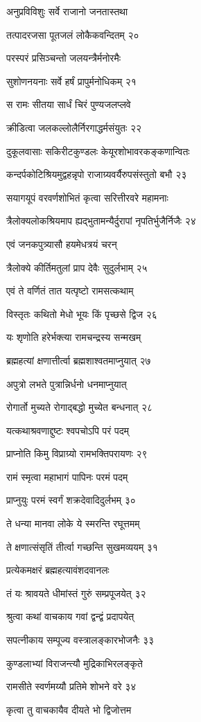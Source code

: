 अनुप्रविविशुः सर्वे राजानो जनतास्तथा

तत्पादरजसा पूतजलं लोकैकवन्दितम् २०

परस्परं प्रसिञ्चन्तो जलयन्त्रैर्मनोरमैः

सुशोणनयनाः सर्वे हर्षं प्रापुर्मनोधिकम् २१

स रामः सीतया सार्धं चिरं पुण्यजलप्लवे

क्रीडित्वा जलकल्लोलैर्निरगाद्धर्मसंयुतः २२

दुकूलवासाः सकिरीटकुण्डलः केयूरशोभावरकङ्कणान्वितः

कन्दर्पकोटिश्रियमुद्वहन्नृपो राजाग्र्यवर्यैरुपसंस्तुतो बभौ २३

सयागयूपं वरवर्णशोभितं कृत्वा सरित्तीरवरे महामनाः

त्रैलोक्यलोकश्रियमाप ह्यद्भुतामन्यैर्दुरापां नृपतिर्भुजैर्निजैः २४

एवं जनकपुत्र्यासौ हयमेधत्रयं चरन्

त्रैलोक्ये कीर्तिमतुलां प्राप देवैः सुदुर्लभाम् २५

एवं ते वर्णितं तात यत्पृष्टो रामसत्कथाम्

विस्तृतः कथितो मेधो भूयः किं पृच्छसे द्विज २६

यः शृणोति हरेर्भक्त्या रामचन्द्रस्य सन्मखम्

ब्रह्महत्यां क्षणात्तीर्त्वा ब्रह्मशाश्वतमाप्नुयात् २७

अपुत्रो लभते पुत्रान्निर्धनो धनमाप्नुयात्

रोगार्तो मुच्यते रोगाद्बद्धो मुच्येत बन्धनात् २८

यत्कथाश्रवणाद्दुष्टः श्वपचोऽपि परं पदम्

प्राप्नोति किमु विप्राग्र्यो रामभक्तिपरायणः २९

रामं स्मृत्वा महाभागं पापिनः परमं पदम्

प्राप्नुयुः परमं स्वर्गं शक्रदेवादिदुर्लभम् ३०

ते धन्या मानवा लोके ये स्मरन्ति रघूत्तमम्

ते क्षणात्संसृतिं तीर्त्वा गच्छन्ति सुखमव्ययम् ३१

प्रत्येकमक्षरं ब्रह्महत्यावंशदवानलः

तं यः श्रावयते धीमांस्तं गुरुं सम्प्रपूजयेत् ३२

श्रुत्वा कथां वाचकाय गवां द्वन्द्वं प्रदापयेत्

सपत्नीकाय सम्पूज्य वस्त्रालङ्कारभोजनैः ३३

कुण्डलाभ्यां विराजन्त्यौ मुद्रिकाभिरलङ्कृते

रामसीते स्वर्णमय्यौ प्रतिमे शोभने वरे ३४

कृत्वा तु वाचकायैव दीयते भो द्विजोत्तम


